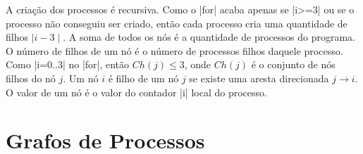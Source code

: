 \documentclass{amsart}
\theoremstyle{plain}
\begin{document}
A criação dos processos é recursiva. Como o |for| acaba apenas se |i>=3| ou se o processo não
conseguiu ser criado, então cada processo cria uma quantidade de filhos $\mid i-3\mid$. A soma de
todos os nós é a quantidade de processos do programa. O número de filhos de um nó é o número de
processos filhos daquele processo. Como |i=0..3| no |for|, então $Ch(j)\leq 3$, onde $Ch(j)$ é o
conjunto de nós filhos do nó $j$. Um nó $i$ é filho de um nó $j$ se existe uma aresta direcionada
$j\rightarrow i$. O valor de um nó é o valor do contador |i| local do processo.

\section{Grafos de Processos}~\label{graphs}

\begin{figure}[h]
\end{figure}
\end{document}

